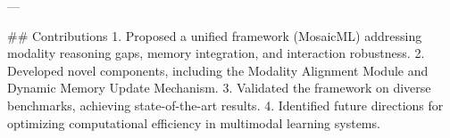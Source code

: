 ---

## Contributions
1. Proposed a unified framework (MosaicML) addressing modality reasoning gaps, memory integration, and interaction robustness.
2. Developed novel components, including the Modality Alignment Module and Dynamic Memory Update Mechanism.
3. Validated the framework on diverse benchmarks, achieving state-of-the-art results.
4. Identified future directions for optimizing computational efficiency in multimodal learning systems.